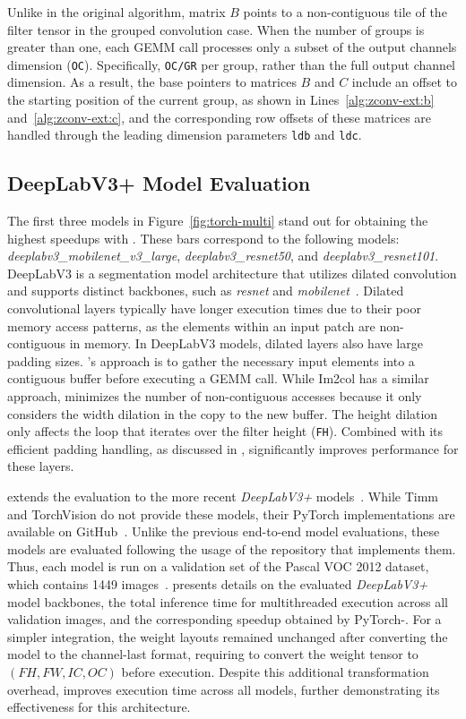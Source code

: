 Unlike in the original algorithm, matrix $B$ points to a non-contiguous tile of the filter tensor in the grouped convolution case.
When the number of groups is greater than one, each GEMM call processes only a subset of the output channels dimension (\texttt{OC}).
Specifically, \texttt{OC/GR} per group, rather than the full output channel dimension.
As a result, the base pointers to matrices $B$ and $C$ include an offset to the starting position of the current group, as shown in Lines~\ref{alg:zconv-ext:b} and~\ref{alg:zconv-ext:c}, and the corresponding row offsets of these matrices are handled through the leading dimension parameters \texttt{ldb} and \texttt{ldc}.

\subsection{DeepLabV3+ Model Evaluation}
\label{sec:deeplabv3plus}

The first three models in Figure~\ref{fig:torch-multi} stand out for obtaining the highest speedups with \algname.
These bars correspond to the following models: \emph{deeplabv3\_mobilenet\_v3\_large}, \emph{deeplabv3\_resnet50}, and \emph{deeplabv3\_resnet101}.
DeepLabV3 is a segmentation model architecture that utilizes dilated convolution and supports distinct backbones, such as \emph{resnet} and \emph{mobilenet}~\cite{Chen2017}.
Dilated convolutional layers typically have longer execution times due to their poor memory access patterns, as the elements within an input patch are non-contiguous in memory.
In DeepLabV3 models, dilated layers also have large padding sizes.
\algname's approach is to gather the necessary input elements into a contiguous buffer before executing a GEMM call.
While Im2col has a similar approach, \algname minimizes the number of non-contiguous accesses because it only considers the width dilation in the copy to the new buffer.
The height dilation only affects the loop that iterates over the filter height (\texttt{FH}).
Combined with its efficient padding handling, as discussed in , \algname significantly improves performance for these layers.

 extends the evaluation to the more recent \emph{DeepLabV3+} models~\cite{Chen2018}.
While Timm and TorchVision do not provide these models, their PyTorch implementations are available on GitHub~\cite{FangGithub}.
Unlike the previous end-to-end model evaluations, these models are evaluated following the usage of the repository that implements them.
Thus, each model is run on a validation set of the Pascal VOC 2012 dataset, which contains 1449 images~\cite{Everingham10}.
 presents details on the evaluated \emph{DeepLabV3+} model backbones, the total inference time for multithreaded execution across all validation images, and the corresponding speedup obtained by PyTorch-\algname.
For a simpler integration, the weight layouts remained unchanged after converting the model to the channel-last format, requiring \algname to convert the weight tensor to $(FH,FW,IC,OC)$ before execution.
Despite this additional transformation overhead, \algname improves execution time across all models, further demonstrating its effectiveness for this architecture.

